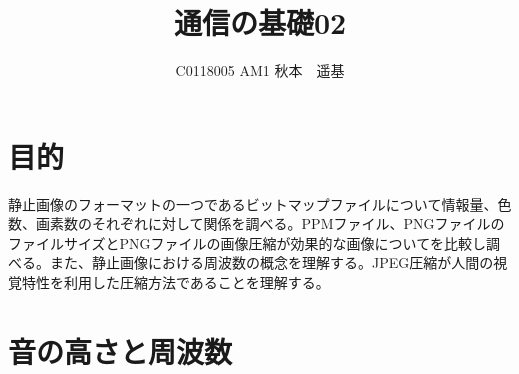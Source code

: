 \documentclass[uplatex, titlepage]{jsarticle}
\title{通信の基礎02}
\author{C0118005 AM1 秋本　遥基}
\date{}
\begin{document}
\maketitle

\section{目的}

  静止画像のフォーマットの一つであるビットマップファイルについて情報量、色数、画素数のそれぞれに対して関係を調べる。PPMファイル、PNGファイルのファイルサイズとPNGファイルの画像圧縮が効果的な画像についてを比較し調べる。また、静止画像における周波数の概念を理解する。JPEG圧縮が人間の視覚特性を利用した圧縮方法であることを理解する。\\

\section{音の高さと周波数}
\label{sec:gazou}
\end{document}
